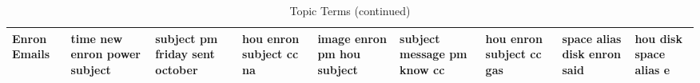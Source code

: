 \documentclass[11pt,a4paper]{article}
\begin{document}
\begin{appendices}
\begin{table*}[htb]
\begin{tiny}
\begin{tabular}{|p{}|p{}|p{}|p{}|p{}|p{}|p{}|p{}|p{}|}
    Enron Emails & time \newline new \newline enron \newline power \newline subject & subject \newline pm \newline friday \newline sent \newline october & hou \newline enron \newline subject \newline cc \newline na & image \newline enron \newline pm \newline hou \newline subject & subject \newline message \newline pm \newline know \newline cc & hou \newline enron \newline subject \newline cc \newline gas & space \newline alias \newline disk \newline enron \newline said & hou \newline disk \newline space \newline alias \newline e\\\hline
    \end{tabular}
\caption{Topic Terms (continued)}
\end{tiny}
\end{table*}

\end{appendices}
\end{document}
